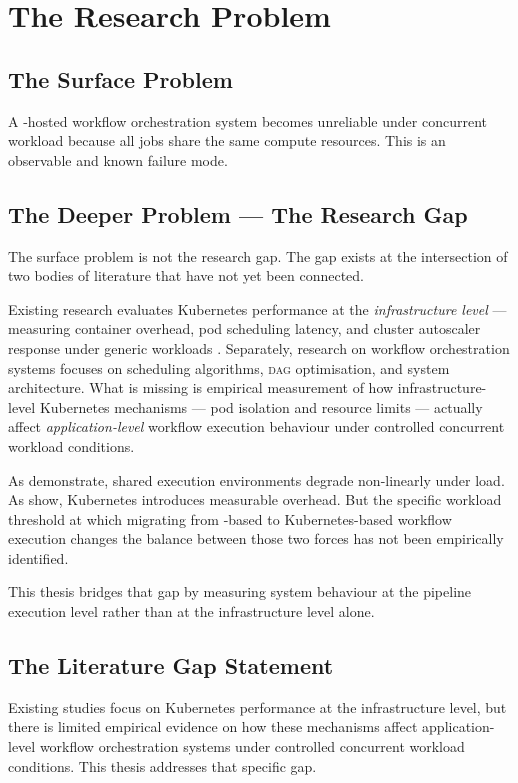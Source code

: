 \section{The Research Problem}

\subsection{The Surface Problem}

A \vm{}-hosted workflow orchestration system becomes unreliable under concurrent workload
because all jobs share the same compute resources. This is an observable and known failure
mode.

\subsection{The Deeper Problem --- The Research Gap}

The surface problem is not the research gap. The gap exists at the intersection of two
bodies of literature that have not yet been connected.

Existing research evaluates Kubernetes performance at the \textit{infrastructure level} ---
measuring container overhead, pod scheduling latency, and cluster autoscaler response under
generic workloads \citep{cilic2023}. Separately, research on workflow orchestration systems
focuses on scheduling algorithms, \textsc{dag} optimisation, and system architecture. What
is missing is empirical measurement of how infrastructure-level Kubernetes mechanisms ---
pod isolation and resource limits --- actually affect \textit{application-level} workflow
execution behaviour under controlled concurrent workload conditions.

As \citet{nanda1991} demonstrate, shared execution environments degrade non-linearly under
load. As \citet{cilic2023} show, Kubernetes introduces measurable overhead. But the specific
workload threshold at which migrating from \vm{}-based to Kubernetes-based workflow
execution changes the balance between those two forces has not been empirically identified.

This thesis bridges that gap by measuring system behaviour at the pipeline execution level
rather than at the infrastructure level alone.

\subsection{The Literature Gap Statement}

Existing studies focus on Kubernetes performance at the infrastructure level, but there is
limited empirical evidence on how these mechanisms affect application-level workflow
orchestration systems under controlled concurrent workload conditions. This thesis addresses
that specific gap.
